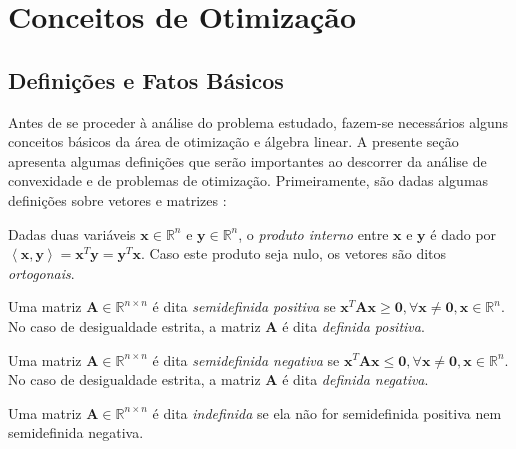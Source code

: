
\section{Conceitos de Otimiza\c{c}\~{a}o}\label{subsec:otimconcepts}

\subsection{Defini\c{c}\~{o}es e Fatos B\'{a}sicos}
Antes de se proceder \`{a} an\'{a}lise do problema estudado, fazem-se necess\'{a}rios alguns conceitos b\'{a}sicos da \'{a}rea de otimiza\c{c}\~{a}o e \'{a}lgebra linear. A presente se\c{c}\~{a}o apresenta algumas defini\c{c}\~{o}es que ser\~{a}o importantes ao descorrer da an\'{a}lise de convexidade e de problemas de otimiza\c{c}\~{a}o. Primeiramente, s\~{a}o dadas algumas defini\c{c}\~{o}es sobre vetores e matrizes \cite{aguirre}:
\begin{definition}\label{dotProd}
Dadas duas vari\'{a}veis $\mathbf{x} \in \mathbb{R}^{n}$ e $\mathbf{y} \in \mathbb{R}^{n}$, o \textit{produto interno} entre $\mathbf{x}$ e $\mathbf{y}$ \'{e} dado por $\left\langle \mathbf{x},\mathbf{y}\right\rangle = \mathbf{x}^{T}\mathbf{y} = \mathbf{y}^{T}\mathbf{x}$. Caso este produto seja nulo, os vetores s\~{a}o ditos \textit{ortogonais}.
\end{definition}
\begin{definition}
Uma matriz $\mathbf{A} \in \mathbb{R}^{n \times n}$ \'{e} dita \textit{semidefinida positiva} se $\mathbf{x}^{T}\mathbf{A}\mathbf{x} \ge \mathbf{0}, \forall\mathbf{x} \ne \mathbf{0}, \mathbf{x} \in \mathbb{R}^{n}$. No caso de desigualdade estrita, a matriz $\mathbf{A}$ \'{e} dita \textit{definida positiva}. 
\end{definition}

\begin{definition}
Uma matriz $\mathbf{A} \in \mathbb{R}^{n \times n}$ \'{e} dita \textit{semidefinida negativa} se $\mathbf{x}^{T}\mathbf{A}\mathbf{x} \le \mathbf{0}, \forall\mathbf{x} \ne \mathbf{0}, \mathbf{x} \in \mathbb{R}^{n}$. No caso de desigualdade estrita, a matriz $\mathbf{A}$ \'{e} dita \textit{definida negativa}. 
\end{definition}

\begin{definition}
Uma matriz $\mathbf{A} \in \mathbb{R}^{n \times n}$ \'{e} dita \textit{indefinida} se ela n\~{a}o for semidefinida positiva nem semidefinida negativa.
\end{definition}

